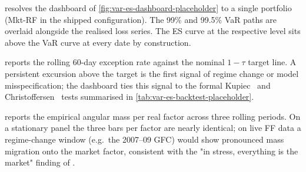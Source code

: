  resolves the dashboard of
\cref{fig:var-es-dashboard-placeholder} to a single portfolio (Mkt-RF
in the shipped configuration). The 99\% and 99.5\% VaR paths are
overlaid alongside the realised loss series. The ES curve at the
respective level sits above the VaR curve at every date by
construction.



 reports the rolling 60-day exception rate against
the nominal $1 - \tau$ target line. A persistent excursion above the
target is the first signal of regime change or model
misspecification; the dashboard ties this signal to the formal
Kupiec~\cite{Kupiec1995} and Christoffersen~\cite{Christoffersen1998}
tests summarised in \cref{tab:var-es-backtest-placeholder}.



 reports the empirical
angular mass per real factor across three rolling periods. On a
stationary panel the three bars per factor are nearly identical; on
live FF data a regime-change window (e.g.\ the 2007--09 GFC) would
show pronounced mass migration onto the market factor, consistent with
the "in stress, everything is the market" finding of
\citet{ChristoffersenErrunzaJacobsLangloi2012}.
